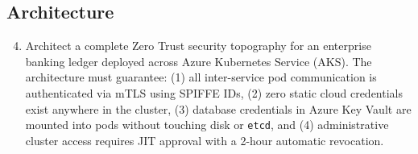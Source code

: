 \subsection{Architecture}
\begin{enumerate}[leftmargin=18pt]
  \setcounter{enumi}{3}
  \item Architect a complete Zero Trust security topography for an enterprise banking ledger deployed across Azure Kubernetes Service (AKS). The architecture must guarantee: (1) all inter-service pod communication is authenticated via mTLS using SPIFFE IDs, (2) zero static cloud credentials exist anywhere in the cluster, (3) database credentials in Azure Key Vault are mounted into pods without touching disk or \texttt{etcd}, and (4) administrative cluster access requires JIT approval with a 2-hour automatic revocation.
\end{enumerate}

